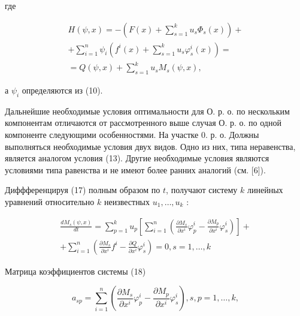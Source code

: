 \documentclass[10pt]{article}
\begin{document}
где



\[

\begin{gathered}

H(\psi, x)=-\left(F(x)+\sum_{s=1}^{k} u_{s} \Phi_{s}(x)\right)+ \\

+\sum_{i=1}^{n} \psi_{i}\left(f^{i}(x)+\sum_{s=1}^{k} u_{s} \varphi_{s}^{i}(x)\right)= \\

=Q(\psi, x)+\sum_{s=1}^{k} u_{s} M_{s}(\psi, x),

\end{gathered}

\]



а $\psi_{i}$ определяются из (10).



Дальнейшие необходимые условия оптимальности для О. р. о. по нескольким компонентам отличаются от рассмотренного выше случая О. р. о. по одной компоненте следующими особенностями. На участке 0. р. о. Должны выполняться необходимые условия двух видов. Одно из них, типа неравенства, является аналогом условия (13). Другие необходимые условия являются условиями типа равенства и не имеют более ранних аналогий (см. [6]).



Диффференцируя (17) полным образом по $t$, получают систему $k$ линейных уравнений относительно $k$ неизвестных $u_{1}, \ldots, u_{k}$ :



\[

\begin{gathered}

\frac{d M_{s}(\psi, x)}{d t}=\sum_{p=1}^{k} u_{p}\left[\sum_{i=1}^{n}\left(\frac{\partial M_{s}}{\partial x^{i}} \varphi_{p}^{i}-\frac{\partial M_{p}}{\partial x^{i}} \varphi_{s}^{i}\right)\right]+ \\

+\sum_{i=1}^{n}\left(\frac{\partial M_{s}}{\partial x^{i}} f^{i}-\frac{\partial Q}{\partial x^{i}} \varphi_{s}^{i}\right)=0, s=1, \ldots, k

\end{gathered}

\]



Матрица коэффициентов системы (18)



\[

a_{s p}=\sum_{i=1}^{n}\left(\frac{\partial M_{s}}{\partial x^{i}} \varphi_{p}^{i}-\frac{\partial M_{p}}{\partial x^{i}} \varphi_{s}^{i}\right), s, p=1, \ldots, k,

\]
\end{document}
